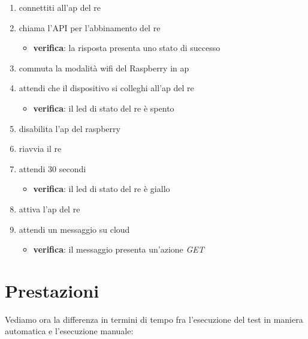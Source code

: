 \documentclass[12pt,a4paper,twoside,titlepage]{book}
\begin{document}
\begin{enumerate}
    \item connettiti all'\acrshort{ap} del \acrshort{re}
    \item chiama l'API per l'abbinamento del \acrshort{re} 
    \begin{itemize}
        \item \textbf{verifica}: la risposta presenta uno stato di successo 
    \end{itemize}
    \item commuta la modalità \Gls{wifi} del Raspberry in \acrshort{ap}
    \item attendi che il dispositivo si colleghi all'\acrshort{ap} del \acrshort{re}
    \begin{itemize}
        \item \textbf{verifica}: il  \acrshort{led} di stato del \acrshort{re} è spento 
    \end{itemize}
    \item disabilita l'\acrshort{ap} del raspberry 
    \item riavvia il \acrshort{re}
    \item attendi 30 secondi 
    \begin{itemize}
        \item \textbf{verifica}: il \acrshort{led} di stato del \acrshort{re} è giallo 
    \end{itemize}
    \item attiva l'\acrshort{ap} del \acrshort{re}
    \item attendi un messaggio su cloud 
    \begin{itemize}
        \item \textbf{verifica}: il messaggio presenta un'azione \textit{GET}
    \end{itemize}
\end{enumerate}
\section{Prestazioni}

Vediamo ora la differenza in termini di tempo fra l'esecuzione del test in maniera automatica
e l'esecuzione manuale:
\end{document}
